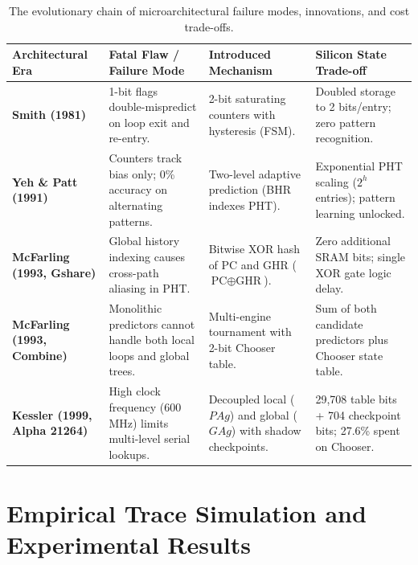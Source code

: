 \documentclass[11pt,a4paper]{article}
\begin{document}
\begin{table}[htbp]
\centering
\caption{The evolutionary chain of microarchitectural failure modes, innovations, and cost trade-offs.}
\label{tab:evolution}
\vspace{0.5em}
\small
\begin{tabularx}{\linewidth}{l p{3.0cm} X p{3.2cm}}
\toprule
\textbf{Architectural Era} & \textbf{Fatal Flaw / Failure Mode} & \textbf{Introduced Mechanism} & \textbf{Silicon State Trade-off} \\
\midrule
\textbf{Smith (1981)} & 1-bit flags double-mispredict on loop exit and re-entry. & 2-bit saturating counters with hysteresis (FSM). & Doubled storage to 2 bits/entry; zero pattern recognition. \\
\addlinespace
\textbf{Yeh \& Patt (1991)} & Counters track bias only; 0\% accuracy on alternating patterns. & Two-level adaptive prediction (BHR indexes PHT). & Exponential PHT scaling ($2^h$ entries); pattern learning unlocked. \\
\addlinespace
\textbf{McFarling (1993, Gshare)} & Global history indexing causes cross-path aliasing in PHT. & Bitwise XOR hash of PC and GHR ($\text{PC} \oplus \text{GHR}$). & Zero additional SRAM bits; single XOR gate logic delay. \\
\addlinespace
\textbf{McFarling (1993, Combine)} & Monolithic predictors cannot handle both local loops and global trees. & Multi-engine tournament with 2-bit Chooser table. & Sum of both candidate predictors plus Chooser state table. \\
\addlinespace
\textbf{Kessler (1999, Alpha 21264)} & High clock frequency (600 MHz) limits multi-level serial lookups. & Decoupled local ($PAg$) and global ($GAg$) with shadow checkpoints. & 29,708 table bits + 704 checkpoint bits; 27.6\% spent on Chooser. \\
\bottomrule
\end{tabularx}
\end{table}

\section{Empirical Trace Simulation and Experimental Results}
\label{sec:experiments}
\end{document}
